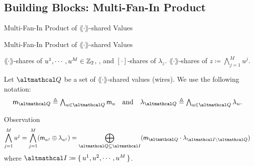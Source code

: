 \documentclass[../240906_cryptlab_flute.tex]{subfiles}
\begin{document}
\subsection{Building Blocks: Multi-Fan-In Product}
\begin{frame}{Multi-Fan-In Product of \(\lang\cdot\rang\)-shared Values}
    \begin{block}{Multi-Fan-In Product of \(\lang\cdot\rang\)-shared Values}
        \begin{description}[Output]
            \ii[Input]
            \(\lang\cdot\rang\)-shares of \(u^1, \cdots, u^M \in \mathbb{Z}_2\), ,
            and \([\cdot]\)-shares of \(\lambda_z\).
            \ii[Output]
            \(\lang\cdot\rang\)-shares of \(z \coloneqq \bigwedge_{j=1}^M u^j\).
        \end{description}
    \end{block}
    \pause
    \begin{exampleblock}{}
        Let \(\mcal{Q}\) be a set of
        \(\lang\cdot\rang\)-shared values (wires).
        We use the following notation:
        \[\textstyle
            \msf{m}_{\mcal{Q}} \triangleq \bigwedge_{u \in \mcal{Q}} \msf{m}_u
            \quad\text{and}\quad
            \lambda_{\mcal{Q}} \triangleq \bigwedge_{u \in \mcal{Q}} \lambda_u.
        \]
    \end{exampleblock}
    \pause
    \begin{exampleblock}{Observation}
        \[
            \bigwedge_{j=1}^M u^j = \bigwedge_{j=1}^M (\msf{m}_{u^j} \oplus \lambda_{u^j})
            = \bigoplus_{\mcal{Q} \subseteq \mcal{I}}
                (\msf{m}_{\mcal{Q}} \cdot \lambda_{\mcal{I} \setminus \mcal{Q}})
        \]
        where \(\mcal{I} \coloneqq \{\,u^1,u^2,\cdots,u^M\,\}\).
    \end{exampleblock}
\end{frame}
\end{document}
